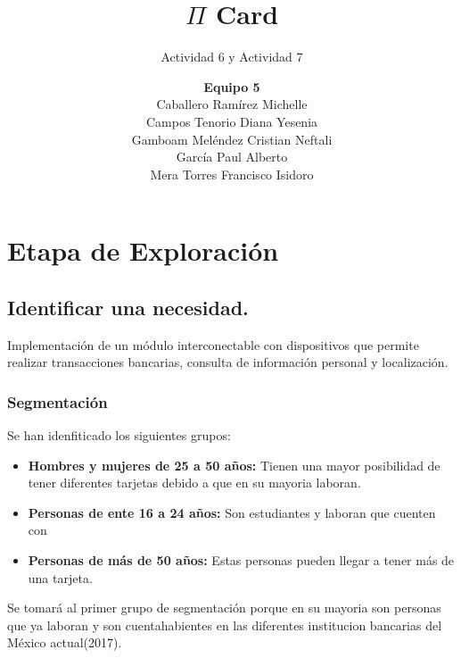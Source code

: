 \documentclass[11pt]{book}
\title{$\Pi$ Card}
\author{\textbf{Equipo 5}\\Caballero Ramírez Michelle\\Campos Tenorio Diana Yesenia\\Gamboam Meléndez Cristian Neftali\\García Paul Alberto\\Mera Torres Francisco Isidoro}
\subtitle{Actividad 6 y Actividad 7}
\date{}
\begin{document}
	\maketitle
	\makeProjectCharter
	\makeFirmas
	\tableofcontents
\chapter{Etapa de Exploración}
	
	\section{Identificar una necesidad.}

	Implementación de un módulo interconectable con dispositivos que permite realizar transacciones bancarias, consulta de información personal y localización.
	
	\subsection{Segmentación}

	Se han idenfiticado los siguientes grupos:
	\begin{itemize}
		\item \textbf{Hombres y mujeres de 25 a 50 años:} Tienen una mayor posibilidad de tener diferentes tarjetas debido a que en su mayoria laboran.
		\item \textbf{Personas de ente 16 a 24 años:} Son estudiantes y laboran que cuenten con 
		\item \textbf{Personas de más de 50 años:} Estas personas pueden llegar a tener más de una tarjeta.
	\end{itemize}
	
	Se tomará al primer grupo de segmentación porque en su mayoria son personas que ya laboran y son cuentahabientes en las diferentes institucion bancarias del México actual(2017).
		
	
\end{document}
